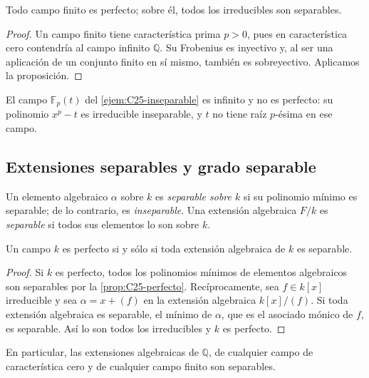 \begin{coro}
Todo campo finito es perfecto; sobre él, todos los irreducibles son separables.
\end{coro}
\begin{proof}
Un campo finito tiene característica prima $p>0$, pues en característica cero contendría al campo infinito $\mathbb Q$. Su Frobenius es inyectivo y, al ser una aplicación de un conjunto finito en sí mismo, también es sobreyectivo. Aplicamos la proposición.
\end{proof}
El campo $\mathbb F_p(t)$ del \cref{ejem:C25-inseparable} es infinito y no es perfecto: su polinomio $x^p-t$ es irreducible inseparable, y $t$ no tiene raíz $p$-ésima en ese campo.

\subsection{Extensiones separables y grado separable}
\begin{defi}
Un elemento algebraico $\alpha$ sobre $k$ es \emph{separable sobre $k$} si su polinomio mínimo es separable; de lo contrario, es \emph{inseparable}. Una extensión algebraica $F/k$ es \emph{separable} si todos sus elementos lo son sobre $k$.
\end{defi}

\begin{prop}
Un campo $k$ es perfecto si y sólo si toda extensión algebraica de $k$ es separable.
\end{prop}
\begin{proof}
Si $k$ es perfecto, todos los polinomios mínimos de elementos algebraicos son separables por la \cref{prop:C25-perfecto}. Recíprocamente, sea $f\in k[x]$ irreducible y sea $\alpha=x+(f)$ en la extensión algebraica $k[x]/(f)$. Si toda extensión algebraica es separable, el mínimo de $\alpha$, que es el asociado mónico de $f$, es separable. Así lo son todos los irreducibles y $k$ es perfecto.
\end{proof}
En particular, las extensiones algebraicas de $\mathbb Q$, de cualquier campo de característica cero y de cualquier campo finito son separables.

